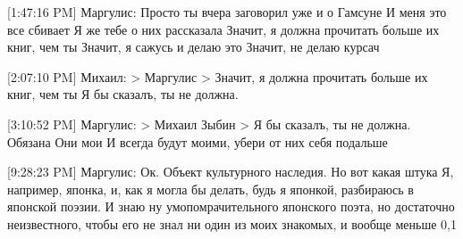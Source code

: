 \documentclass{article}
\begin{document}
{[1:47:16 PM] Маргулис:
Просто ты вчера заговорил уже и о Гамсуне
 И меня это все сбивает
 Я же тебе о них рассказала
 Значит, я должна прочитать больше их книг, чем ты
 Значит, я сажусь и делаю это
 Значит, не делаю курсач

[2:07:10 PM] Михаил:
> Маргулис
> Значит, я должна прочитать больше их книг, чем ты
Я бы сказалъ, ты не должна.

[3:10:52 PM] Маргулис:
> Михаил Зыбин
> Я бы сказалъ, ты не должна.
Обязана
 Они мои
 И всегда будут моими, убери от них себя подальше

[9:28:23 PM] Маргулис:
Ок. Объект культурного наследия. 
Но вот какая штука
Я, например, японка, и, как я могла бы делать, будь я японкой, разбираюсь в японской поэзии. И знаю ну умопомрачительного японского поэта, но достаточно неизвестного, чтобы его не знал ни один из моих знакомых, и вообще меньше 0,1%
}
\end{document}
